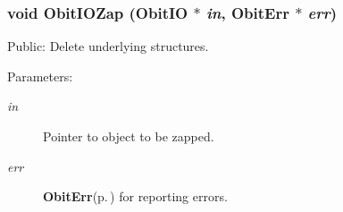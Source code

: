 \subsubsection{\setlength{\rightskip}{0pt plus 5cm}void Obit\-IOZap ({\bf Obit\-IO} $\ast$ {\em in}, {\bf Obit\-Err} $\ast$ {\em err})}\label{ObitIO_8h_a33}


Public: Delete underlying structures. 

\begin{Desc}
\item[Parameters:]
\begin{description}
\item[{\em in}]Pointer to object to be zapped. \item[{\em err}]{\bf Obit\-Err}{\rm (p.\,\pageref{structObitErr})} for reporting errors. \end{description}
\end{Desc}
